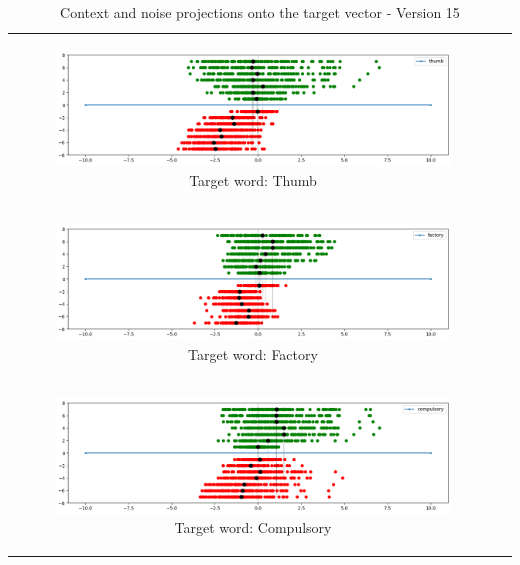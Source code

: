 \begin{table}[p]
  \centering
  \begin{tabular}{cc}
    \begin{subfigure}{0.95\textwidth}
      \includegraphics[width=\linewidth]{img/thumb_v15.png}
      \caption{Target word: Thumb}
    \end{subfigure} \\
    \begin{subfigure}{0.95\textwidth}
      \includegraphics[width=\linewidth]{img/factory_v15.png}
      \caption{Target word: Factory}
    \end{subfigure} \\
    \begin{subfigure}{0.95\textwidth}
      \includegraphics[width=\linewidth]{img/compulsory_v15.png}
      \caption{Target word: Compulsory}
    \end{subfigure} 
  \end{tabular}
  \caption{Context and noise projections onto the target vector - Version 15}
  \label{tab:v15_projections}
\end{table}


